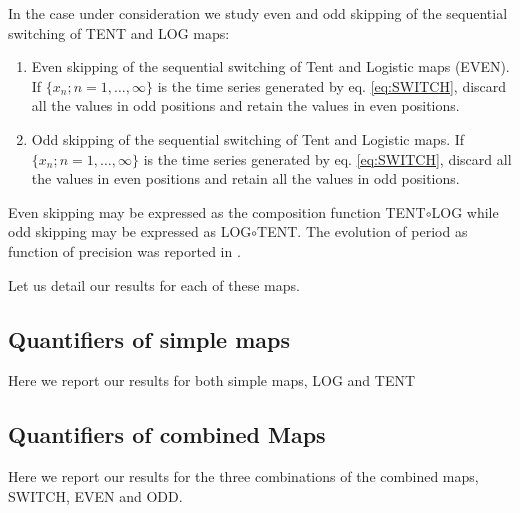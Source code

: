 In the case under consideration we study even and odd skipping of the sequential switching of TENT and LOG maps:
\begin{enumerate}[leftmargin=*,labelsep=4.9mm]
	\item Even skipping of the sequential switching of Tent and Logistic maps (EVEN).\\
	If $\{x_n; n=1,\dots,\infty\}$ is the time series generated by eq. \eqref{eq:SWITCH}, discard all the values in odd positions and retain the values in even positions.
	\item Odd skipping of the sequential switching of Tent and Logistic maps.
	If $\{x_n; n=1,\dots,\infty\}$ is the time series generated by eq. \eqref{eq:SWITCH}, discard all the values in even positions and retain all the values in odd positions.
\end{enumerate}

Even skipping may be expressed as the composition function TENT$\circ$LOG while odd skipping may be expressed as LOG$\circ$TENT.
The evolution of period as function of precision was reported in \cite{Nagaraj2008}.

Let us detail our results for each of these maps.



\subsection {Quantifiers of simple maps}\label{subsec:SimpleMaps}
Here we report our results for both simple maps, LOG and TENT



 

\subsection{Quantifiers of combined Maps}\label{subsec:SecSwitch}
Here we report our results for the three combinations of the combined maps, SWITCH, EVEN and ODD.



